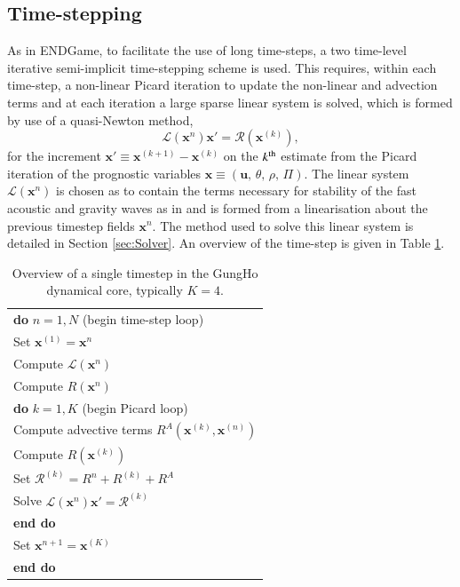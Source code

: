 \documentclass[review,times]{elsarticle}
\providecommand{\tabularnewline}{\\}
\begin{document}
\subsection{Time-stepping\label{sec:sub:timestepping}}
As in ENDGame, to facilitate the use of long time-steps, a two time-level 
iterative semi-implicit time-stepping scheme is used. This requires, within each 
time-step, a non-linear Picard iteration to update the non-linear and advection terms 
and at each iteration a large sparse linear system is solved, which is formed by 
use of a quasi-Newton method,
%
\begin{equation}
\mathcal{L}\left(\mathbf{x}^n\right)\mathbf{x}' = \mathcal{R}\left(\mathbf{x}^{(k)}\right),\label{eq:quasi-newton}
\end{equation}
%
for the increment $\mathbf{x}'\equiv\mathbf{x}^{(k+1)}-\mathbf{x}^{(k)}$ on the $k^{\rm{th}}$ 
estimate from the Picard iteration of the prognostic variables $\mathbf{x}\equiv\left(\mathbf{u},\,\theta,\,\rho,\,\Pi\right)$. The linear system $\mathcal{L}\left(\mathbf{x}^n\right)$ is chosen as to contain the terms necessary for stability of the fast acoustic and gravity waves as in \cite{QJ:QJ2235} and is formed from a linearisation about the previous timestep fields $\mathbf{x}^n$. The method used to solve this linear system is detailed in Section \ref{sec:Solver}. An overview of the 
time-step is given in Table \ref{tab:timestep}.
%
\begin{table}
\begin{centering}
\begin{tabular}{l}
\hline 
\textbf{do} $n=1,N$ (begin time-step loop)\tabularnewline
\hspace{0.5cm}Set $\mathbf{x}^{(1)} = \mathbf{x}^n$\tabularnewline
\hspace{0.5cm}Compute $\mathcal{L}\left(\mathbf{x}^n\right)$\tabularnewline
\hspace{0.5cm}Compute $R\left(\mathbf{x}^n\right)$\tabularnewline
\hspace{0.5cm}\textbf{do} $k=1,K$ (begin Picard loop)\tabularnewline
\hspace{1.0cm}Compute advective terms $R^A\left(\mathbf{x}^{(k)},\mathbf{x}^{(n)}\right)$\tabularnewline
\hspace{1.0cm}Compute $R\left(\mathbf{x}^{(k)}\right)$\tabularnewline
\hspace{1.0cm}Set $\mathcal{R}^{(k)} = R^n + R^{(k)} + R^A$\tabularnewline

\hspace{1.0cm}Solve $\mathcal{L}\left(\mathbf{x}^n\right)\mathbf{x}' = \mathcal{R}^{(k)}$\tabularnewline
\hspace{0.5cm}\textbf{end do}\tabularnewline
\hspace{0.5cm}Set $\mathbf{x}^{n+1} = \mathbf{x}^{(K)}$\tabularnewline
\textbf{end do}\tabularnewline
\hline
\end{tabular}
\end{centering}
\caption{\label{tab:timestep}Overview of a single timestep in the GungHo dynamical core, typically $K=4$.}
\end{table}
%
\end{document}
